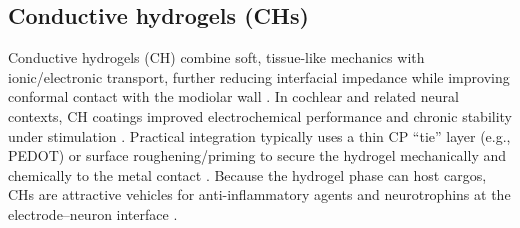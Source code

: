 \documentclass[referee,pdflatex, sn-vancouver-num]{sn-jnl}%
\theoremstyle{thmstyleone}%
\theoremstyle{thmstyletwo}%
\theoremstyle{thmstylethree}%
\begin{document}
\subsection{Conductive hydrogels (CHs)}
Conductive hydrogels (CH) combine soft, tissue-like mechanics with ionic/electronic transport, further reducing interfacial impedance while improving conformal contact with the modiolar wall \cite{Green2012}. In cochlear and related neural contexts, CH coatings improved electrochemical performance and chronic stability under stimulation \cite{Hassarati2014,Dalrymple2020,Hyakumura2021, Pandey2023_MRSC_CHReview}. Practical integration typically uses a thin CP ``tie'' layer (e.g., PEDOT) or surface roughening/priming to secure the hydrogel mechanically and chemically to the metal contact \cite{Kleber2017,Chhin2018}. Because the hydrogel phase can host cargos, CHs are attractive vehicles for anti-inflammatory agents and neurotrophins at the electrode--neuron interface \cite{Green2012,Hassarati2014}.
\end{document}
